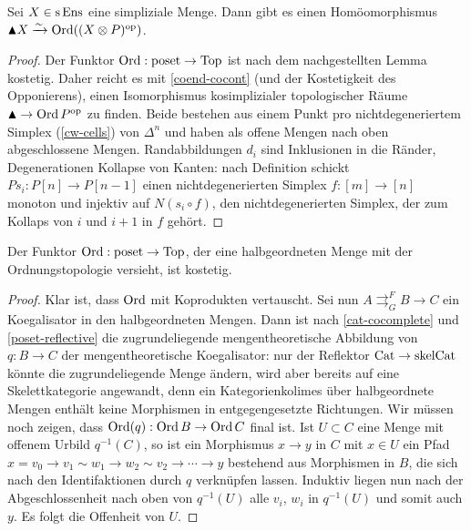 \begin{prop} \label{clumsy-order-top}
  Sei $X \in \operatorname{s}\operatorname{Ens}$ eine simpliziale Menge. Dann gibt es einen
  Homöomorphismus $\blacktriangle X \xrightarrow[]{\sim} \operatorname{Ord}((X \otimes P)^\mathrm{op})$.
\end{prop}
\begin{proof}
  Der Funktor $\operatorname{Ord}: \operatorname{poset} \to \operatorname{Top}$ ist nach dem nachgestellten
  Lemma kostetig. Daher reicht es mit \ref{coend-cocont} (und der
  Kostetigkeit des Opponierens), einen Isomorphismus kosimplizialer
  topologischer Räume $\blacktriangle \to \operatorname{Ord} P^\mathrm{op}$ zu finden. Beide
  bestehen aus einem Punkt pro nichtdegeneriertem Simplex
  (\ref{cw-cells}) von $\Delta^n$ und haben als offene Mengen nach
  oben abgeschlossene Mengen. Randabbildungen $d_i$ sind Inklusionen
  in die Ränder, Degenerationen Kollapse von Kanten: nach Definition
  schickt $Ps_i: P[n] \to P[n-1]$ einen nichtdegenerierten Simplex $f:
  [m] \to [n]$ monoton und injektiv auf $N(s_i \circ f)$, den
  nichtdegenerierten Simplex, der zum Kollaps von $i$ und $i+1$ in $f$
  gehört.
\end{proof}
\begin{lemma}
  Der Funktor $\operatorname{Ord}: \operatorname{poset} \to \operatorname{Top}$, der eine halbgeordneten Menge
  mit der Ordnungstopologie versieht, ist kostetig.
\end{lemma}
\begin{proof}
    Klar ist, dass $\operatorname{Ord}$ mit Koprodukten vertauscht. Sei nun $A
    \mathrel{\mathop{\rightrightarrows}^{F}_{G}} B \to C$ ein
    Koegalisator in den halbgeordneten Mengen. Dann ist nach
    \ref{cat-cocomplete} und \ref{poset-reflective} die
    zugrundeliegende mengentheoretische Abbildung von $q: B \to C$ der
    mengentheoretische Koegalisator: nur der Reflektor $\operatorname{Cat} \to
    \mathrm{skelCat}$ könnte die zugrundeliegende Menge ändern, wird
    aber bereits auf eine Skelettkategorie angewandt, denn ein
    Kategorienkolimes über halbgeordnete Mengen enthält keine
    Morphismen in entgegengesetzte Richtungen. Wir müssen noch zeigen,
    dass $\operatorname{Ord}(q): \operatorname{Ord} B \to \operatorname{Ord} C$ final ist. Ist $U \subset C$
    eine Menge mit offenem Urbild $q^{-1}(C)$, so ist ein Morphismus
    $x \to y$ in $C$ mit $x \in U$ ein Pfad $x = v_0 \to v_1 \sim w_1
    \to w_2 \sim v_2 \to \cdots \to y$ bestehend aus Morphismen in
    $B$, die sich nach den Identifaktionen durch $q$ verknüpfen
    lassen. Induktiv liegen nun nach der Abgeschlossenheit nach oben
    von $q^{-1}(U)$ alle $v_i$, $w_i$ in $q^{-1}(U)$ und somit auch
    $y$. Es folgt die Offenheit von $U$.
\end{proof}

